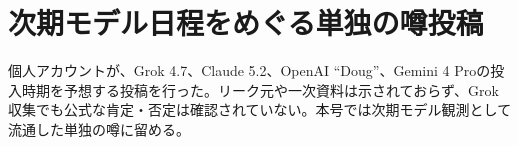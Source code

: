 \section{次期モデル日程をめぐる単独の噂投稿}
個人アカウントが、Grok 4.7、Claude 5.2、OpenAI ``Doug''、Gemini 4 Proの投入時期を予想する投稿を行った。リーク元や一次資料は示されておらず、Grok収集でも公式な肯定・否定は確認されていない。本号では次期モデル観測として流通した単独の噂に留める。
